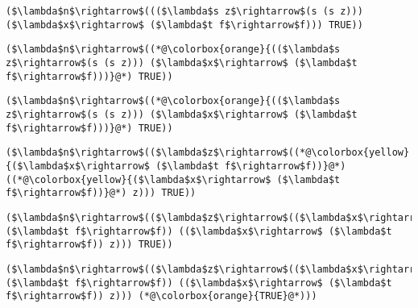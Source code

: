 \documentclass{beamer}
\begin{document}
\begin{frame}[fragile]{\CurrentSection}
\lstset{basicstyle=\ttfamily\small}\lstset{numbers=none}\lstset{language=ML}\begin{lstlisting}
($\lambda$n$\rightarrow$((($\lambda$s z$\rightarrow$(s (s z))) ($\lambda$x$\rightarrow$ ($\lambda$t f$\rightarrow$f))) TRUE))
\end{lstlisting}
\pause\lstset{language=ML}\begin{lstlisting}
($\lambda$n$\rightarrow$((*@\colorbox{orange}{(($\lambda$s z$\rightarrow$(s (s z))) ($\lambda$x$\rightarrow$ ($\lambda$t f$\rightarrow$f)))}@*) TRUE))
\end{lstlisting}

\end{frame}

\begin{frame}[fragile]{\CurrentSection}
\lstset{basicstyle=\ttfamily\small}\lstset{numbers=none}\lstset{language=ML}\begin{lstlisting}
($\lambda$n$\rightarrow$((*@\colorbox{orange}{(($\lambda$s z$\rightarrow$(s (s z))) ($\lambda$x$\rightarrow$ ($\lambda$t f$\rightarrow$f)))}@*) TRUE))
\end{lstlisting}
\pause\lstset{language=ML}\begin{lstlisting}
($\lambda$n$\rightarrow$(($\lambda$z$\rightarrow$((*@\colorbox{yellow}{($\lambda$x$\rightarrow$ ($\lambda$t f$\rightarrow$f))}@*) ((*@\colorbox{yellow}{($\lambda$x$\rightarrow$ ($\lambda$t f$\rightarrow$f))}@*) z))) TRUE))
\end{lstlisting}

\end{frame}

\begin{frame}[fragile]{\CurrentSection}
\lstset{basicstyle=\ttfamily\small}\lstset{numbers=none}\lstset{language=ML}\begin{lstlisting}
($\lambda$n$\rightarrow$(($\lambda$z$\rightarrow$(($\lambda$x$\rightarrow$ ($\lambda$t f$\rightarrow$f)) (($\lambda$x$\rightarrow$ ($\lambda$t f$\rightarrow$f)) z))) TRUE))
\end{lstlisting}
\pause\lstset{language=ML}\begin{lstlisting}
($\lambda$n$\rightarrow$(($\lambda$z$\rightarrow$(($\lambda$x$\rightarrow$ ($\lambda$t f$\rightarrow$f)) (($\lambda$x$\rightarrow$ ($\lambda$t f$\rightarrow$f)) z))) (*@\colorbox{orange}{TRUE}@*)))
\end{lstlisting}

\end{frame}
\end{document}
